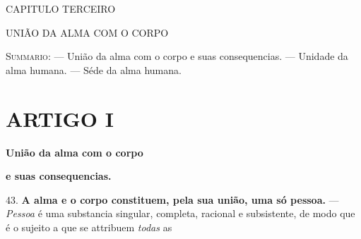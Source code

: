 




CAPITULO TERCEIRO

UNIÃO DA ALMA COM O CORPO

\textsc{Summario}: --- União da alma com o corpo e suas consequencias. --- Unidade da alma humana. --- Séde da alma humana.


\section*{ARTIGO I}

 \textbf{União da alma com o corpo}

\textbf{e suas consequencias.}

43. \textbf{A alma e o corpo constituem, pela sua união, uma só pessoa.} --- \emph{Pessoa} é uma substancia singular, completa, racional e subsistente, de modo que é o sujeito a que se attribuem \emph{todas} as

